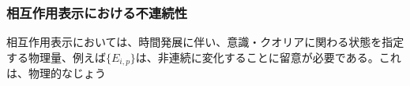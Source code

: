 \subsubsection{相互作用表示における不連続性}
相互作用表示においては、時間発展に伴い、意識・クオリアに関わる状態を指定する物理量、例えば$\{E_{i,p}\}$は、非連続に変化することに留意が必要である。これは、物理的なじょう
